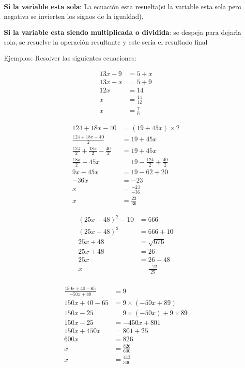 \begin{itemize}
        \textbf{Si la variable esta sola}: La ecuación esta resuelta(si la variable
        esta sola pero negativa se invierten los signos de la igualdad).

        \textbf{Si la variable esta siendo multiplicada o dividida}: se despeja
        para dejarla sola, se resuelve la operación resultante y este seria el
        resultado final
\end{itemize}

    Ejemplos: Resolver las siguientes ecuaciones:

    \begin{align*}
        13x - 9 &=5 + x		\\
        13x -x &= 5 +9\\
        12x &= 14 \\
        x &= \frac{14}{12} \\
        x&= \frac{7}{6}
    \end{align*}

    \begin{align*}
        124 + 18x -40 &= (19+45x)\times2 		\\
        \frac{124+18x-40}{2}&= 19 + 45x\\
        \frac{124}{2} +\frac{18x}{2} - \frac{40}{2}  &= 19 +45x\\
        \frac{18x}{2} -45x &= 19-\frac{124}{2} +\frac{40}{2} \\
        9x -45x &= 19-62+20\\
        -36x &=-23\\
        x &= \frac{-23}{-36} \\
        x &=\frac{23}{36}
    \end{align*}

    \begin{align*}
        (25x + 48)^2 -10 &= 666 \\
        (25x + 48)^2  &= 666+10 \\
        25x +48 &= \sqrt{676}\\
        25x + 48 &= 26 \\
        25x &= 26-48\\
        x &=  \frac{-22}{25}\\
    \end{align*}

    \begin{align*}
        \frac{150x+40 -65}{-50x +89}  &= 9 		\\
        150x+40-65 &= 9\times(-50x+89)\\
        150x -25 &= 9\times(-50x) + 9\times 89\\
        150x -25 &= -450x + 801\\
        150x + 450x &= 801 + 25\\
        600x &= 826\\
        x&=\frac{826}{600} \\
        x &= \frac{413}{300}
    \end{align*}


